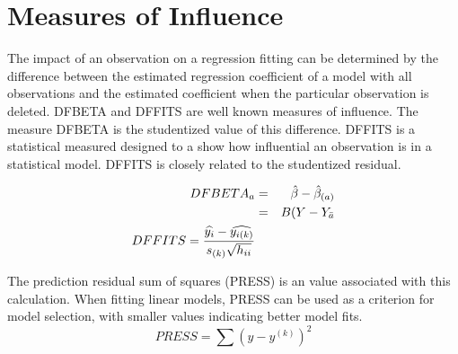 \documentclass[12pt, a4paper]{report}
\theoremstyle{plain}
\theoremstyle{definition}
\theoremstyle{remark}
\begin{document}
\section{Measures of Influence} 

The impact of an observation on a regression fitting can be determined by the difference between the estimated regression coefficient of a model with all observations and the estimated coefficient when the particular observation is deleted. DFBETA and DFFITS are well known measures of influence. The measure DFBETA is the studentized value of this difference. DFFITS is a statistical measured designed to a show how influential an observation is in a statistical model. DFFITS is closely related to the studentized residual.

\begin{eqnarray}
DFBETA_{a} &=& \hat{\beta} - \hat{\beta}_{(a)} \\
&=& B(Y-Y_{\bar{a}}
\\ DFFITS = {\widehat{y_i} -
	\widehat{y_{i(k)}} \over s_{(k)} \sqrt{h_{ii}}} 
\end{eqnarray}

The prediction residual sum of squares (PRESS) is an value associated with this calculation. When fitting linear models, PRESS can be used as a criterion for model selection, with smaller values indicating better model fits.
\begin{displaymath}
PRESS = \sum(y-y^{(k)})^2
\end{displaymath}
%	
%	

\end{document}
